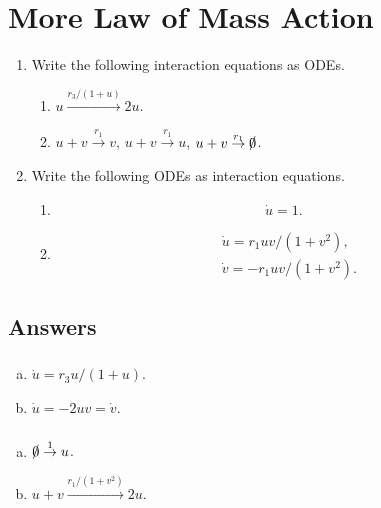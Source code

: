\documentclass[]{article}
\newcommand{\bb}{\begin{equation}}
\newcommand{\ee}{\end{equation}}
\begin{document}
\section{More Law of Mass Action}
\begin{enumerate}
\item Write the following interaction equations as ODEs.
\begin{enumerate}
\item $u\stackrel{r_3/(1+u)}{\rightarrow}2u$.
\item $u+v\stackrel{r_1}{\rightarrow}v$, $u+v\stackrel{r_1}{\rightarrow}u$, $u+v\stackrel{r_1}{\rightarrow}\slashed{0}$.
\end{enumerate}

\item Write the following ODEs as interaction equations.
\begin{enumerate}
\item
\bb
\dot{u}=1\nonumber.
\ee
\item
\begin{align}
&\dot{u}=r_1uv/(1+v^2),\nonumber\\
&\dot{v}=-r_1uv/(1+v^2).\nonumber
\end{align}
\end{enumerate}
\end{enumerate}
\begin{Answ}
\subsection{Answers}
\subsubsection{}
\begin{enumerate}[(a)]
\item $\dot{u}=r_3u/(1+u)$.
\item $\dot{u}=-2uv=\dot{v}$.
\end{enumerate}
\subsubsection{}
\begin{enumerate}[(a)]
\item $\slashed{0}\stackrel{1}{\rightarrow}u$.
\item $u+v\stackrel{r_1/(1+v^2)}{\rightarrow}2u$.
\end{enumerate}
\end{Answ}
\end{document}
